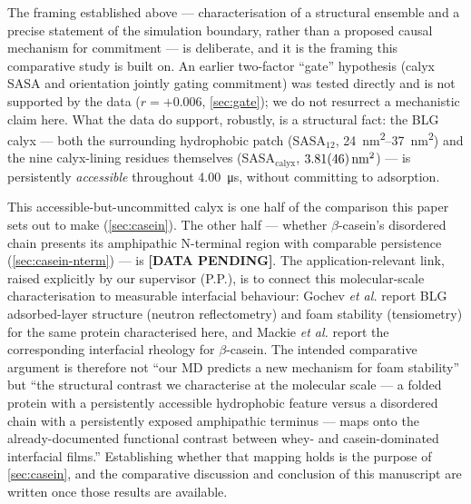 \documentclass[11pt,a4paper]{article}
\begin{document}
The framing established above --- characterisation of a structural
ensemble and a precise statement of the simulation boundary, rather than
a proposed causal mechanism for commitment --- is deliberate, and it is
the framing this comparative study is built on. An earlier two-factor
``gate'' hypothesis (calyx SASA and orientation jointly gating
commitment) was tested directly and is not supported by the data
($r = +0.006$, \cref{sec:gate}); we do not resurrect a mechanistic claim
here. What the data do support, robustly, is a structural fact: the BLG
calyx --- both the surrounding hydrophobic patch (SASA$_{12}$,
\SIrange{24}{37}{\nano\metre\squared}) and the nine calyx-lining residues
themselves (SASA$_\mathrm{calyx}$, $\SI{3.81 \pm 0.46}{\nano\metre\squared}$)
--- is persistently \emph{accessible} throughout \SI{4.00}{\micro\second},
without committing to adsorption.

This accessible-but-uncommitted calyx is one half of the comparison this
paper sets out to make (\cref{sec:casein}). The other half --- whether
$\beta$-casein's disordered chain presents its amphipathic N-terminal
region with comparable persistence (\cref{sec:casein-nterm}) --- is
\textbf{[DATA PENDING]}. The application-relevant link, raised explicitly
by our supervisor (P.P.), is to connect this molecular-scale
characterisation to measurable interfacial behaviour: Gochev
\textit{et al.}\citep{Gochev2019JPCB,Foam4_2020} report BLG adsorbed-layer
structure (neutron reflectometry) and foam stability (tensiometry) for
the same protein characterised here, and Mackie \textit{et al.}\citep{Mackie1999}
report the corresponding interfacial rheology for $\beta$-casein. The
intended comparative argument is therefore not ``our MD predicts a new
mechanism for foam stability'' but ``the structural contrast we
characterise at the molecular scale --- a folded protein with a
persistently accessible hydrophobic feature versus a disordered chain
with a persistently exposed amphipathic terminus --- maps onto the
already-documented functional contrast between whey- and casein-dominated
interfacial films.'' Establishing whether that mapping holds is the
purpose of \cref{sec:casein}, and the comparative discussion and
conclusion of this manuscript are written once those results are
available.
\end{document}
